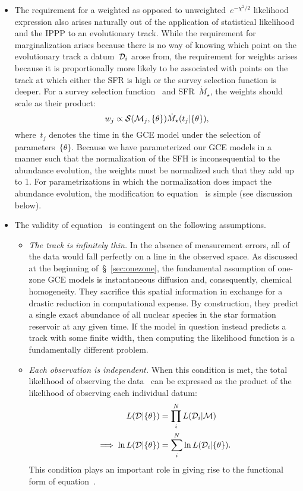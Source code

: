 \documentclass[ms.tex]{subfiles}
\begin{document}
\begin{itemize}
	\item The requirement for a weighted as opposed to
	unweighted~$e^{-\chi^2/2}$ likelihood expression also arises naturally out
	of the application of statistical likelihood and the IPPP to an
	evolutionary track.
	While the requirement for marginalization arises because there is no way of
	knowing which point on the evolutionary track a datum~$\mathcal{D}_i$ arose
	from, the requirement for weights arises because it is proportionally more
	likely to be associated with points on the track at which either the SFR is
	high or the survey selection function is deeper.
	For a survey selection function~ and SFR~$\dot{M}_\star$, the
	weights should scale as their product:
	\begin{equation}
	w_j \propto \mathcal{S}(\mathcal{M}_j, \{\theta\}) \dot{M}_\star(t_j |
	\{\theta\}),
	\label{eq:weights}
	\end{equation}
	where~$t_j$ denotes the time in the GCE model under the selection of
	parameters~$\{\theta\}$.
	Because we have parameterized our GCE models in a manner such that the
	normalization of the SFH is inconsequential to the abundance evolution,
	the weights must be normalized such that they add up to 1.
	For parametrizations in which the normalization does impact the abundance
	evolution, the modification to equation~ is simple
	(see discussion below).

	\item The validity of equation~ is contingent on the
	following assumptions.
	\begin{itemize}
		\item \textit{The track is infinitely thin.}
		In the absence of measurement errors, all of the data would fall
		perfectly on a line in the observed space.
		As discussed at the beginning of~\S~\ref{sec:onezone}, the
		fundamental assumption of one-zone GCE models is instantaneous
		diffusion and, consequently, chemical homogeneity.
		They sacrifice this spatial information in exchange for a drastic
		reduction in computational expense.
		By construction, they predict a single exact abundance of all nuclear
		species in the star formation reservoir at any given time.
		If the model in question instead predicts a track with some finite
		width, then computing the likelihood function is a fundamentally
		different problem.

		\item \textit{Each observation is independent.}
		When this condition is met, the total likelihood of observing the
		data~ can be expressed as the product of the likelihood of
		observing each individual datum:
		\begin{subequations}\begin{align}
		L(\mathcal{D} | \{\theta\}) &= \prod_i^N L(\mathcal{D}_i | \mathcal{M})
		\\
		\implies \ln L(\mathcal{D} | \{\theta\}) &= \sum_i^N \ln
		L(\mathcal{D}_i | \{\theta\}).
		\end{align}\end{subequations}
		This condition plays an important role in giving rise to the
		functional form of equation~.


\end{itemize}
\end{itemize}
\end{document}
